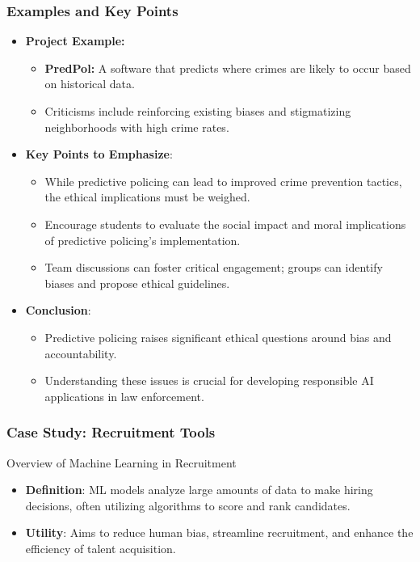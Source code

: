 \documentclass[aspectratio=169]{beamer}
\begin{document}
\begin{frame}[fragile]
    \frametitle{Examples and Key Points}
    \begin{itemize}
        \item \textbf{Project Example:} 
            \begin{itemize}
                \item \textbf{PredPol:} A software that predicts where crimes are likely to occur based on historical data.
                \item Criticisms include reinforcing existing biases and stigmatizing neighborhoods with high crime rates.
            \end{itemize}

        \item \textbf{Key Points to Emphasize}:
            \begin{itemize}
                \item While predictive policing can lead to improved crime prevention tactics, the ethical implications must be weighed.
                \item Encourage students to evaluate the social impact and moral implications of predictive policing's implementation.
                \item Team discussions can foster critical engagement; groups can identify biases and propose ethical guidelines.
            \end{itemize}
        
        \item \textbf{Conclusion}:
            \begin{itemize}
                \item Predictive policing raises significant ethical questions around bias and accountability.
                \item Understanding these issues is crucial for developing responsible AI applications in law enforcement.
            \end{itemize}
    \end{itemize}
\end{frame}

\begin{frame}[fragile]
    \frametitle{Case Study: Recruitment Tools}
    \begin{block}{Overview of Machine Learning in Recruitment}
        \begin{itemize}
            \item \textbf{Definition}: ML models analyze large amounts of data to make hiring decisions, often utilizing algorithms to score and rank candidates.
            \item \textbf{Utility}: Aims to reduce human bias, streamline recruitment, and enhance the efficiency of talent acquisition.
        \end{itemize}
    \end{block}
\end{frame}
\end{document}
